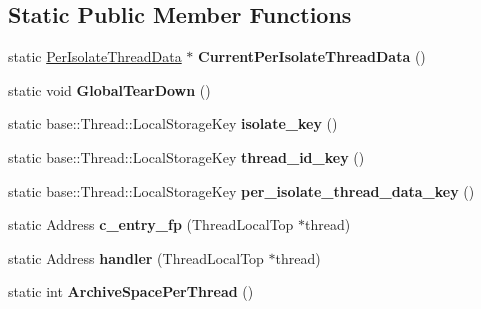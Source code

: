\subsection*{Static Public Member Functions}
\begin{DoxyCompactItemize}
\item 
\hypertarget{classv8_1_1internal_1_1_isolate_a826750b3afeec400dcbc3091f7cbef84}{}static \hyperlink{classv8_1_1internal_1_1_isolate_1_1_per_isolate_thread_data}{Per\+Isolate\+Thread\+Data} $\ast$ {\bfseries Current\+Per\+Isolate\+Thread\+Data} ()\label{classv8_1_1internal_1_1_isolate_a826750b3afeec400dcbc3091f7cbef84}

\item 
\hypertarget{classv8_1_1internal_1_1_isolate_a58b2490f1aa72b15db0a7dabd81db0e2}{}static void {\bfseries Global\+Tear\+Down} ()\label{classv8_1_1internal_1_1_isolate_a58b2490f1aa72b15db0a7dabd81db0e2}

\item 
\hypertarget{classv8_1_1internal_1_1_isolate_a4e0d9e77cb3331ca8bc2dd0ae01b5a4c}{}static base\+::\+Thread\+::\+Local\+Storage\+Key {\bfseries isolate\+\_\+key} ()\label{classv8_1_1internal_1_1_isolate_a4e0d9e77cb3331ca8bc2dd0ae01b5a4c}

\item 
\hypertarget{classv8_1_1internal_1_1_isolate_a1ecc3a0f0812809ca5f9b97ae781dd09}{}static base\+::\+Thread\+::\+Local\+Storage\+Key {\bfseries thread\+\_\+id\+\_\+key} ()\label{classv8_1_1internal_1_1_isolate_a1ecc3a0f0812809ca5f9b97ae781dd09}

\item 
\hypertarget{classv8_1_1internal_1_1_isolate_addd1786f6d8285282b1f05a83b51869a}{}static base\+::\+Thread\+::\+Local\+Storage\+Key {\bfseries per\+\_\+isolate\+\_\+thread\+\_\+data\+\_\+key} ()\label{classv8_1_1internal_1_1_isolate_addd1786f6d8285282b1f05a83b51869a}

\item 
\hypertarget{classv8_1_1internal_1_1_isolate_a25b6042dc972873b942b76f31686c6e1}{}static Address {\bfseries c\+\_\+entry\+\_\+fp} (Thread\+Local\+Top $\ast$thread)\label{classv8_1_1internal_1_1_isolate_a25b6042dc972873b942b76f31686c6e1}

\item 
\hypertarget{classv8_1_1internal_1_1_isolate_ac37e0be2395f4f264decdc154993510d}{}static Address {\bfseries handler} (Thread\+Local\+Top $\ast$thread)\label{classv8_1_1internal_1_1_isolate_ac37e0be2395f4f264decdc154993510d}

\item 
\hypertarget{classv8_1_1internal_1_1_isolate_a7a165e2049a92057523bacbcaaadbeb4}{}static int {\bfseries Archive\+Space\+Per\+Thread} ()\label{classv8_1_1internal_1_1_isolate_a7a165e2049a92057523bacbcaaadbeb4}

\end{DoxyCompactItemize}
